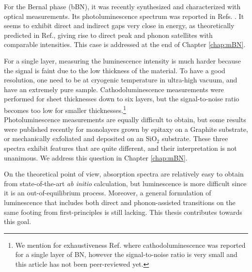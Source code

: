 For the Bernal phase (\acrshort{bBN}), it was recently synthesized and characterized with optical measurements. Its photoluminescence spectrum was reported in Refs. \cite{rousseau2022bernal,rousseau2022phonon}. It seems to exhibit direct and indirect gaps very close in energy, as theoretically predicted in Ref.\cite{sponza2018direct}, giving rise to direct peak and phonon satellites with comparable intensities. This case is addressed at the end of Chapter \ref{chap:mBN}.


For a single layer, measuring the luminescence intensity is much harder because the signal is faint due to the low thickness of the material. To have a good resolution, one need to be at cryogenic temperature in ultra-high vacuum, and have an extremely pure sample.
Cathodoluminescence measurements were performed for sheet thicknesses down to six layers,\cite{schue2016dimensionality} but the signal-to-noise ratio becomes too low for smaller thicknesses.\footnote{We mention for exhaustiveness Ref. \cite{shima2023cathodoluminescence} where cathodoluminescence was reported for a single layer of BN, however the signal-to-noise ratio is very small and this article has not been peer-reviewed yet.} \\
Photoluminescence measurements are equally difficult to obtain, but some results were published recently for monolayers grown by epitaxy on a Graphite substrate,\cite{elias2019direct,wang2022scalable} or mechanically exfoliated and deposited on an SiO$_2$ substrate.\cite{rousseau2021monolayer} These three spectra exhibit features that are quite different, and their interpretation is not unanimous. We address this question in Chapter \ref{chap:mBN}. 

On the theoretical point of view, absorption spectra are relatively easy to obtain from state-of-the-art \textit{ab initio} calculation, but luminescence is more difficult since it is an out-of-equilibrium process. Moreover, a general formulation of luminescence that includes both direct and phonon-assisted transitions on the same footing from first-principles is still lacking. This thesis contributes towards this goal.


